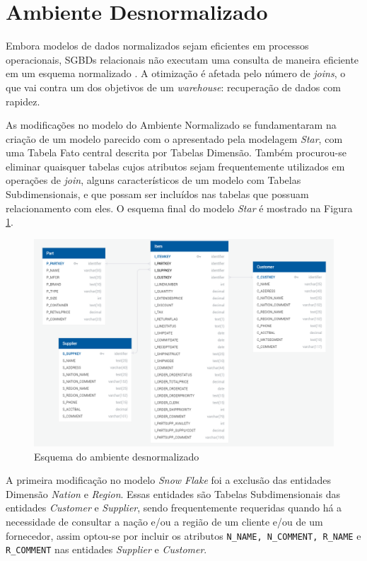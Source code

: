 \section{Ambiente Desnormalizado}

Embora modelos de dados normalizados sejam eficientes em processos operacionais, SGBDs relacionais não executam uma consulta de maneira eficiente em um esquema normalizado \cite{kimball2002dw}. A otimização é afetada pelo número de \textit{joins}, o que vai contra um dos objetivos de um \textit{warehouse}: recuperação de dados com rapidez. 

As modificações no modelo do Ambiente Normalizado se fundamentaram na criação de um modelo parecido com o apresentado pela modelagem \textit{Star}, com uma Tabela Fato central descrita por Tabelas Dimensão. Também procurou-se eliminar quaisquer tabelas cujos atributos sejam frequentemente utilizados em operações de \textit{join}, alguns característicos de um modelo com Tabelas Subdimensionais, e que possam ser incluídos nas tabelas que possuam relacionamento com eles. O esquema final do modelo \textit{Star} é mostrado na Figura \ref{fig:star}.

\begin{figure}[h]
	\centering
		\includegraphics[width=\textwidth]{img/star.png}
	\caption{Esquema do ambiente desnormalizado}
	\label{fig:star}
\end{figure}
 
A primeira modificação no modelo \textit{Snow Flake} foi a exclusão das entidades Dimensão \textit{Nation} e \textit{Region}. Essas entidades são Tabelas Subdimensionais das entidades \textit{Customer} e \textit{Supplier}, sendo frequentemente requeridas quando há a necessidade de consultar a nação e/ou a região de um cliente e/ou de um fornecedor, assim optou-se por incluir os atributos \texttt{N\_NAME, N\_COMMENT, R\_NAME} e \texttt{R\_COMMENT} nas entidades \textit{Supplier} e \textit{Customer}. 

